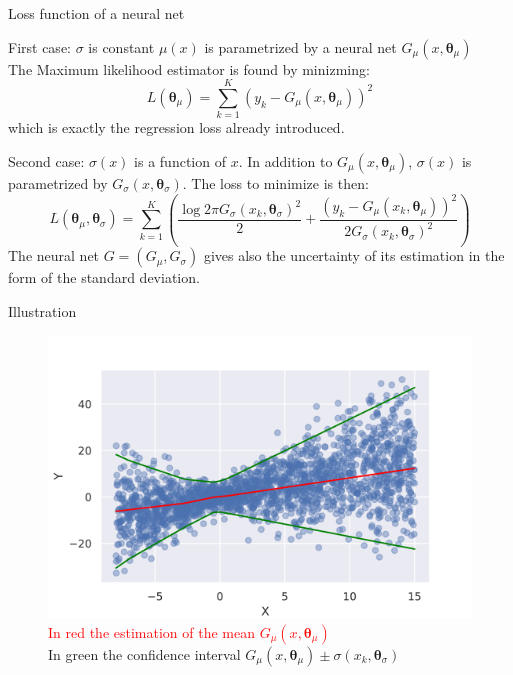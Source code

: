 \documentclass[handout]{beamer}
\begin{document}
\begin{frame}{Loss function of a neural net}
   \begin{block}{First case: $\sigma$ is constant}
   $\mu(x)$ is parametrized by a neural net $ G_\mu(x,{\boldsymbol \theta}_\mu)$\\
   The Maximum likelihood estimator is found by minizming:
   $$
L({\boldsymbol \theta}_\mu) =  \sum_{k=1}^{K} (y_k - G_\mu(x,{\boldsymbol \theta}_\mu))^2
$$
which is exactly the regression loss already introduced.
   \end{block}
\pause
{\footnotesize
\begin{block}{Second case:  $\sigma(x)$ is a function of $x$.}
In addition to $ G_\mu(x,{\boldsymbol \theta}_\mu)$, $\sigma(x)$ is parametrized by $G_\sigma(x,{\boldsymbol \theta}_\sigma)$.
The loss to minimize is then:
$$
L({\boldsymbol \theta}_\mu, {\boldsymbol \theta}_\sigma) = \sum_{k=1}^{K} \left(\frac{\log 2\pi G_\sigma(x_k,{\boldsymbol \theta}_\sigma)^2}{2} + \frac{(y_k - G_\mu(x_k,{\boldsymbol \theta}_\mu))^2}{2 G_\sigma(x_k,{\boldsymbol \theta}_\sigma)^2}\right)
$$
The neural net $G=(G_\mu,  G_\sigma)$ gives  also the uncertainty of its estimation in the form of the standard deviation.
\end{block}}
\end{frame}
\begin{frame}{Illustration}
\begin{figure}
    \centering
    \includegraphics[width=.8\textwidth]{fig/L3/MLE.png}\\
    \textcolor{red}{In red the estimation of the mean $ G_\mu(x,{\boldsymbol \theta}_\mu)$}\\
    \textcolor{mygreen}{In green the confidence interval $ G_\mu(x,{\boldsymbol \theta}_\mu) \pm \sigma(x_k,{\boldsymbol \theta}_\sigma) $}
\end{figure}

\end{frame}
\end{document}
